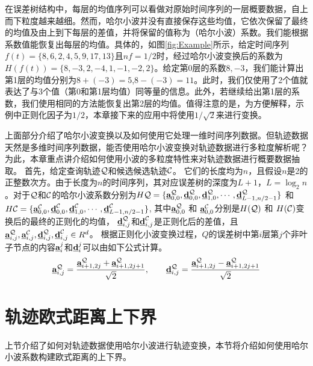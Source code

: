 在误差树结构中，每层的均值序列可以看做对原始时间序列的一层概要数据，自上而下粒度越来越细。然而，哈尔小波并没有直接保存这些均值，它依次保留了最终的均值及由上到下每层的差值，并将保留的值称为（哈尔小波）系数。我们能根据系数值能恢复出每层的均值。具体的，如图\ref{fig:Example}所示，给定时间序列$f(t)=\{8,6,2,4,5,9,17,13\}$且$nf=1/2$时，经过哈尔小波变换后的系数为$H(f(t))=\{8,-3,2,-4,1,-1,-2,2\}$。给定第0层的系数$8,-3$，我们能计算出第1层的均值分别为$8+(-3)=5$,$8-(-3)=11$。此时，我们仅使用了2个值就表达了与3个值（第0和第1层均值）同等量的信息。此外，若继续给出第1层的系数，我们使用相同的方法能恢复出第2层的均值。值得注意的是，为方便解释，示例中正则化因子为$1/2$，本章接下来的应用中将使用$1/\sqrt{2}$来进行变换。

 上面部分介绍了哈尔小波变换以及如何使用它处理一维时间序列数据。但轨迹数据天然是多维时间序列数据，能否使用哈尔小波变换对轨迹数据进行多粒度解析呢？为此，本章重点讲介绍如何使用小波的多粒度特性来对轨迹数据进行概要数据抽取。
 首先，给定查询轨迹$\cal Q$和候选候选轨迹$\cal C$。
 它们的长度均为$n$，且假设$n$是2的正整数次方。由于长度为$n$的时间序列，其对应误差树的深度为$L+1$，$L=\log_{2}n$。对于$\cal Q$和$\cal C$的哈尔小波系数分别为$H{\cal Q}=\{\emph{{\textbf{a}}}_{0,0}^{\cal Q},\emph{{\textbf{d}}}_{0,0}^{\cal Q}, \emph{{\textbf{d}}}_{1,0}^{\cal Q},\cdots,\emph{{\textbf{d}}}_{L-1,n/2-1}^{\cal Q}\}$ 和 $H{\cal C}=\{\emph{{\textbf{a}}}_{0,0}^{\cal C},\emph{{\textbf{d}}}_{0,0}^{\cal C},\emph{{\textbf{d}}}_{1,0}^{\cal C},\cdots,\emph{{\textbf{d}}}_{L-1,n/2-1}^{\cal C}\}$, 
 其中$\emph{{\textbf{a}}}_{0,0}^{\cal Q}$ 和 $\emph{{\textbf{a}}}_{0,0}^{\cal C}$分别是$H({\cal Q})$ 和 $H({\cal C})$变换后的最终的正则化的均值， $\emph{{\textbf{d}}}_{i,j}^{\cal Q}$和$\emph{{\textbf{d}}}_{i,j}^{\cal C}$是正则化后的差值，且$\emph{{\textbf{a}}}_{i,j}^{\cal Q}, \emph{{\textbf{a}}}_{i,j}^{\cal C}, \emph{{\textbf{d}}}_{i,j}^{\cal Q}, \emph{{\textbf{d}}}_{i,j}^{\cal C} \in R^d$。
 根据正则化小波变换过程，$Q$的误差树中第$i$层第$j$个非叶子节点的内容$\emph{{\textbf{a}}}_{i}^{j}$和$\emph{{\textbf{d}}}_{i}^{j}$可以由如下公式计算。
 \begin{eqnarray}
\emph{{\textbf{a}}}_{i,j}^{\cal Q}=\frac{\emph{{\textbf{a}}}_{i+1,2j}^{\cal Q} + \emph{{\textbf{a}}}_{i+1,2j+1}^{\cal Q} }{\sqrt{2}},\qquad \emph{{\textbf{d}}}_{i,j}^{\cal Q}=\frac{\emph{{\textbf{a}}}_{i+1,2j}^{\cal Q} - \emph{{\textbf{a}}}_{i+1,2j+1}^{\cal Q} }{\sqrt{2}}
 \end{eqnarray}
 
 \section{轨迹欧式距离上下界}\label{sec-c4-Bound}
上节介绍了如何对轨迹数据使用哈尔小波进行轨迹变换，本节将介绍如何使用哈尔小波系数构建欧式距离的上下界。
